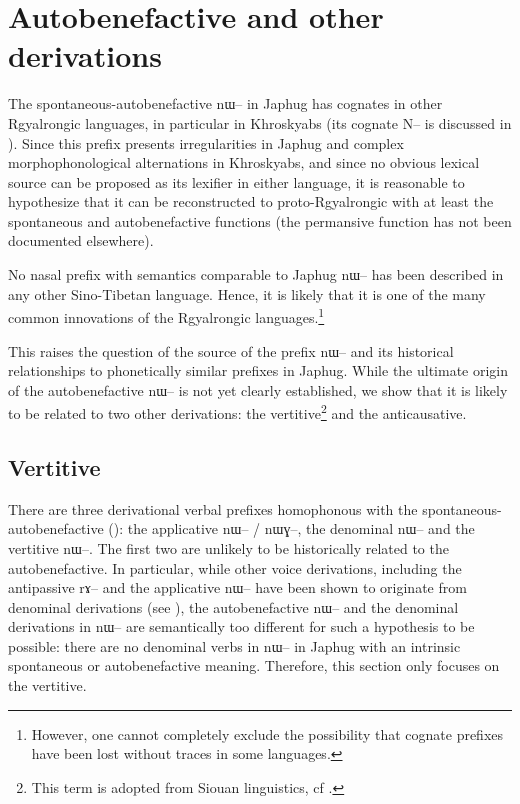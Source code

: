 \documentclass[oldfontcommands,oneside,a4paper,11pt]{article}
\newcommand{\ipa}[1]{{\phon \mbox{#1}}} %
\begin{document}
\section{Autobenefactive and other derivations}

The spontaneous-autobenefactive \ipa{nɯ--} in Japhug has cognates in other Rgyalrongic languages, in particular in Khroskyabs (its cognate \ipa{N--} is discussed in \citealt[157-160]{lai13affixale}). Since this prefix presents irregularities in Japhug and complex morphophonological alternations in Khroskyabs, and since no obvious lexical source can be proposed as its lexifier in either language, it is reasonable to hypothesize that it can be reconstructed to proto-Rgyalrongic with at least the spontaneous and autobenefactive functions (the permansive function has not been documented elsewhere).


No nasal prefix with semantics comparable to Japhug \ipa{nɯ--} has been described in any other Sino-Tibetan language. Hence, it is likely that it is one of the many common innovations of the Rgyalrongic languages.\footnote{However, one cannot completely exclude the possibility that cognate prefixes have been lost without traces in some languages.} 

This raises the question of the source of the prefix \ipa{nɯ--} and its historical relationships to phonetically similar prefixes in Japhug. While the ultimate origin of the autobenefactive \ipa{nɯ--} is not yet clearly established, we show that it is likely to be related to two other derivations: the vertitive\footnote{This term is adopted from Siouan linguistics, cf \citet{taylor76motion}.} and the anticausative.



\subsection{Vertitive}
There are three derivational verbal prefixes homophonous with the spontaneous-autobenefactive (\citealt{jacques13tropative}): the applicative \ipa{nɯ--} / \ipa{nɯɣ--}, the denominal \ipa{nɯ--} and the vertitive \ipa{nɯ--}. The first two are unlikely to be historically related to the autobenefactive. In particular, while other voice derivations, including the antipassive \ipa{rɤ--} and the applicative \ipa{nɯ--}  have been shown to originate from denominal derivations (see \citealt{jacques14antipassive}), the autobenefactive \ipa{nɯ--} and the denominal derivations in \ipa{nɯ--} are semantically too different for such a hypothesis to be possible: there are no denominal verbs in \ipa{nɯ--}  in Japhug with an intrinsic spontaneous or autobenefactive meaning. Therefore, this section only focuses on the vertitive.
\end{document}
